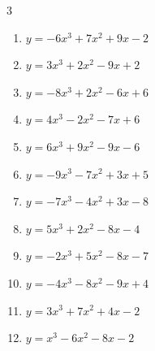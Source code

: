 \begin{multicols}{3}
\begin{enumerate}
  \item $y=-6x^{3}+7x^{2}+9x-2$


  \item $y=3x^{3}+2x^{2}-9x+2$


  \item $y=-8x^{3}+2x^{2}-6x+6$


  \item $y=4x^{3}-2x^{2}-7x+6$


  \item $y=6x^{3}+9x^{2}-9x-6$


  \item $y=-9x^{3}-7x^{2}+3x+5$


  \item $y=-7x^{3}-4x^{2}+3x-8$


  \item $y=5x^{3}+2x^{2}-8x-4$


  \item $y=-2x^{3}+5x^{2}-8x-7$


\columnbreak %

\resetques

  \item $y=-4x^{3}-8x^{2}-9x+4$


  \item $y=3x^{3}+7x^{2}+4x-2$


  \item $y=x^{3}-6x^{2}-8x-2$



\end{enumerate}
\end{multicols}
